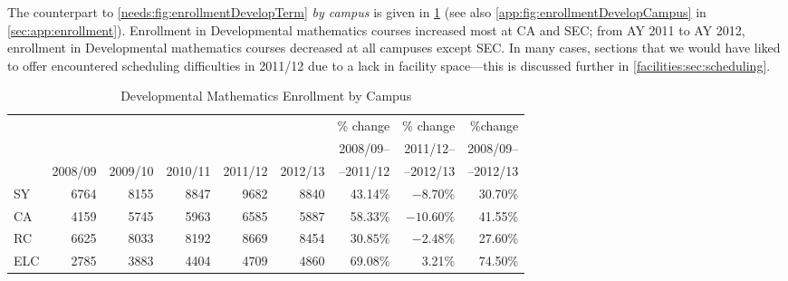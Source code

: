 The counterpart
to \cref{needs:fig:enrollmentDevelopTerm} \emph{by campus} is given in \cref{needs:tab:enrollmentDevelp}
(see also \cref{app:fig:enrollmentDevelopCampus} in \vref{sec:app:enrollment}).
Enrollment in Developmental mathematics courses increased most
at CA and SEC; from AY 2011 to AY 2012, enrollment in Developmental mathematics courses
decreased at all campuses except SEC. In many cases,
sections that we would have liked to offer encountered scheduling difficulties in 2011/12 due to a lack 
in facility space---this is discussed further in  \vref{facilities:sec:scheduling}.

\begin{table}[!htb]
	\begin{widepage}
	\centering
	\caption{Developmental Mathematics Enrollment by Campus}
	\label{needs:tab:enrollmentDevelp}
	\begin{tabularx}{\linewidth}{X*{7}rr}
		\toprule
		    &         &         &         &         &         & \% change  & \% change  & \%change  \\
		    &         &         &         &         &         & 2008/09-- & 2011/12--  & 2008/09-- \\
		    & 2008/09 & 2009/10 & 2010/11 & 2011/12 & 2012/13 & --2011/12  & --2012/13  & --2012/13 \\
		\midrule
		SY  & 6764    & 8155    & 8847    & 9682    & 8840    & 43.14\%    & $-8.70\%$  & 30.70\%   \\
		CA  & 4159    & 5745    & 5963    & 6585    & 5887    & 58.33\%    & $-10.60\%$ & 41.55\%   \\
		RC  & 6625    & 8033    & 8192    & 8669    & 8454    & $30.85\%$  & $-2.48\%$  & 27.60\%   \\
		ELC & 2785    & 3883    & 4404    & 4709    & 4860    & $69.08\%$  & 3.21\%     & 74.50\%   \\
		\bottomrule
	\end{tabularx}
	\end{widepage}
\end{table}

